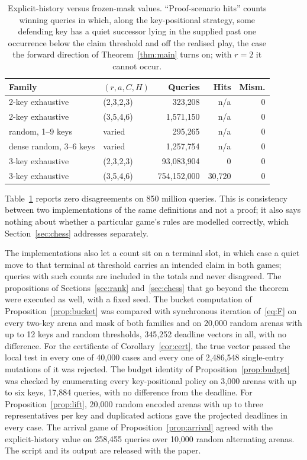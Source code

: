 \documentclass[journal]{IEEEtran}
\theoremstyle{definition}
\theoremstyle{remark}
\begin{document}
\begin{table}[t]\centering\footnotesize
\caption{Explicit-history versus frozen-mask values. ``Proof-scenario hits'' counts winning queries in which, along the key-positional strategy, some defending key has a quiet successor lying in the supplied past one occurrence below the claim threshold and off the realised play, the case the forward direction of Theorem~\ref{thm:main} turns on; with $r=2$ it cannot occur.}
\label{tab:abstract}
\begin{tabular}{@{}llrrr@{}}\toprule
Family & $(r,a,C,H)$ & Queries & Hits & Mism.\\ \midrule
2-key exhaustive & (2,3,2,3) & 323{,}208 & n/a & 0\\
2-key exhaustive & (3,5,4,6) & 1{,}571{,}150 & n/a & 0\\
random, 1--9 keys & varied & 295{,}265 & n/a & 0\\
dense random, 3--6 keys & varied & 1{,}257{,}754 & n/a & 0\\
3-key exhaustive & (2,3,2,3) & 93{,}083{,}904 & 0 & 0\\
3-key exhaustive & (3,5,4,6) & 754{,}152{,}000 & 30{,}720 & 0\\ \bottomrule
\end{tabular}
\end{table}

Table~\ref{tab:abstract} reports zero disagreements on 850 million queries. This is consistency between two implementations of the same definitions and not a proof; it also says nothing about whether a particular game's rules are modelled correctly, which Section~\ref{sec:chess} addresses separately.

The implementations also let a count sit on a terminal slot, in which case a quiet move to that terminal at threshold carries an intended claim in both games; queries with such counts are included in the totals and never disagreed. The propositions of Sections~\ref{sec:rank} and~\ref{sec:chess} that go beyond the theorem were executed as well, with a fixed seed. The bucket computation of Proposition~\ref{prop:bucket} was compared with synchronous iteration of~\eqref{eq:F} on every two-key arena and mask of both families and on 20{,}000 random arenas with up to 12 keys and random thresholds, 345{,}252 deadline vectors in all, with no difference. For the certificate of Corollary~\ref{cor:cert}, the true vector passed the local test in every one of 40{,}000 cases and every one of 2{,}486{,}548 single-entry mutations of it was rejected. The budget identity of Proposition~\ref{prop:budget} was checked by enumerating every key-positional policy on 3{,}000 arenas with up to six keys, 17{,}884 queries, with no difference from the deadline. For Proposition~\ref{prop:lift}, 20{,}000 random encoded arenas with up to three representatives per key and duplicated actions gave the projected deadlines in every case. The arrival game of Proposition~\ref{prop:arrival} agreed with the explicit-history value on 258{,}455 queries over 10{,}000 random alternating arenas. The script and its output are released with the paper.
\end{document}
